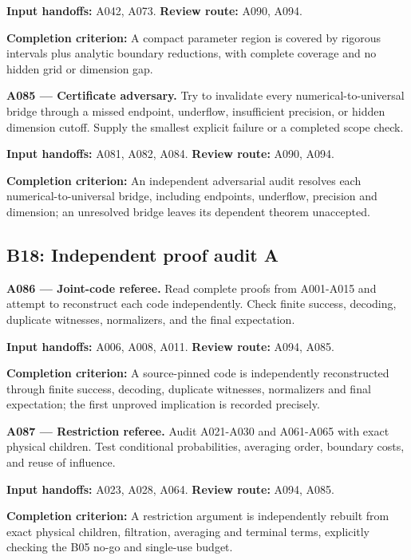 \documentclass[11pt]{article}
\begin{document}
{\small\color{ink}\textbf{Input handoffs:} A042, A073. \textbf{Review route:} A090, A094.\par
\textbf{Completion criterion:} A compact parameter region is covered by rigorous intervals plus analytic boundary reductions, with complete coverage and no hidden grid or dimension gap.\par}



\textbf{A085 --- Certificate adversary.} Try to invalidate every numerical-to-universal bridge through a missed endpoint, underflow, insufficient precision, or hidden dimension cutoff. Supply the smallest explicit failure or a completed scope check.

{\small\color{ink}\textbf{Input handoffs:} A081, A082, A084. \textbf{Review route:} A090, A094.\par
\textbf{Completion criterion:} An independent adversarial audit resolves each numerical-to-universal bridge, including endpoints, underflow, precision and dimension; an unresolved bridge leaves its dependent theorem unaccepted.\par}



\subsection{B18: Independent proof audit A}

\textbf{A086 --- Joint-code referee.} Read complete proofs from A001-A015 and attempt to reconstruct each code independently. Check finite success, decoding, duplicate witnesses, normalizers, and the final expectation.

{\small\color{ink}\textbf{Input handoffs:} A006, A008, A011. \textbf{Review route:} A094, A085.\par
\textbf{Completion criterion:} A source-pinned code is independently reconstructed through finite success, decoding, duplicate witnesses, normalizers and final expectation; the first unproved implication is recorded precisely.\par}



\textbf{A087 --- Restriction referee.} Audit A021-A030 and A061-A065 with exact physical children. Test conditional probabilities, averaging order, boundary costs, and reuse of influence.

{\small\color{ink}\textbf{Input handoffs:} A023, A028, A064. \textbf{Review route:} A094, A085.\par
\textbf{Completion criterion:} A restriction argument is independently rebuilt from exact physical children, filtration, averaging and terminal terms, explicitly checking the B05 no-go and single-use budget.\par}
\end{document}
